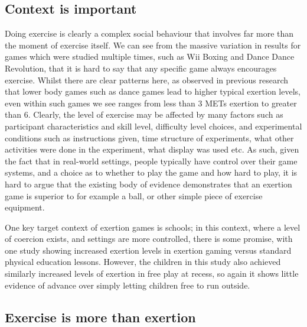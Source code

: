 \subsection{Context is important}
Doing exercise is clearly a complex social behaviour that involves far more than the moment of exercise itself. We can see from the massive variation in results for games which were studied multiple times, such as Wii Boxing and Dance Dance Revolution, that it is hard to say that any specific game always encourages exercise. Whilst there are clear patterns here, as observed in previous research \cite{Peng_2011} that lower body games such as dance games lead to higher typical exertion levels, even within such games we see ranges from less than 3 METs exertion to greater than 6. Clearly, the level of exercise may be affected by many factors such as participant characteristics and skill level, difficulty level choices, and experimental conditions such as instructions given, time structure of experiments, what other activities were done in the experiment, what display was used etc. As such, given the fact that in real-world settings, people typically have control over their game systems, and a choice as to whether to play the game and how hard to play, it is hard to argue that the existing body of evidence demonstrates that an exertion game is superior to for example a ball, or other simple piece of exercise equipment. 

One key target context of exertion games is schools; in this context, where a level of coercion exists, and settings are more controlled, there is some promise, with one study \cite{Gao2015AExergaming} showing increased exertion levels in exertion gaming versus standard physical education lessons. However, the children in this study also achieved similarly increased levels of exertion in free play at recess, so again it shows little evidence of advance over simply letting children free to run outside.

\subsection{Exercise is more than exertion}

